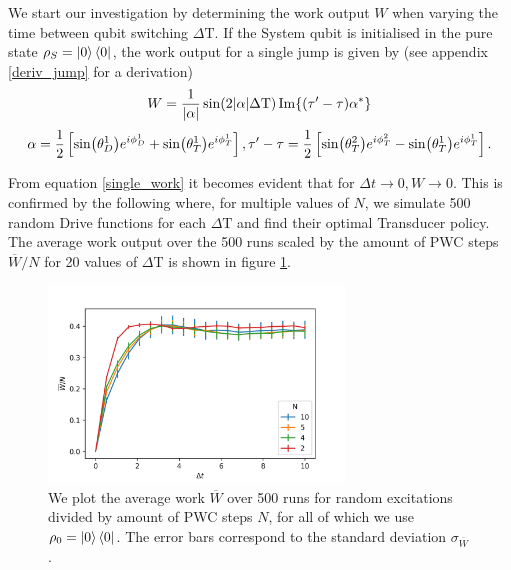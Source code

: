 We start our investigation by determining the work output $W$ when varying the time between qubit switching $\Delta \mathrm{T}$.
If the System qubit is initialised in the pure state $\rho_S = \ket{0} \bra{0}$, the work output for a single jump is given by (see appendix \ref{deriv_jump} for a derivation)
\begin{equation} \label{single_work}
	W = \frac{1}{\abs{\alpha}} \sin(2\abs{\alpha}\Delta \mathrm{T}) \Im{(\tau' - \tau) \alpha^*}
\end{equation}
\begin{equation*}
	\alpha = \frac{1}{2} \left[\sin(\theta_D^1) e^{i\phi_D^1} + \sin(\theta_T^1) e^{i\phi_T^1}\right], \\
	\tau' - \tau = \frac{1}{2} \left[ \sin(\theta_T^2)e^{i\phi_T^2} - \sin(\theta_T^1)e^{i\phi_T^1} \right].
\end{equation*}

From equation \ref{single_work} it becomes evident that for $\Delta t \to 0, W \to 0$. This is confirmed by the following where, for multiple values of $N$, we simulate 500 random Drive functions for each $\Delta \mathrm{T}$ and find their optimal Transducer policy. The average work output over the 500 runs scaled by the amount of PWC steps $\overline{W}/N$ for 20 values of $\Delta \mathrm{T}$ is shown in figure \ref{dt_dep}.

\begin{figure}
	\centering
	\includegraphics[width=0.7\textwidth]{img/dt_dep}
	\caption{We plot the average work $\overline{W}$ over 500 runs for random excitations divided by amount of PWC steps $N$, for all of which we use $\rho_0 = \ket{0}\bra{0}$. The error bars correspond to the standard deviation $\sigma_{\overline{W}}$.}
	\label{dt_dep}
\end{figure}